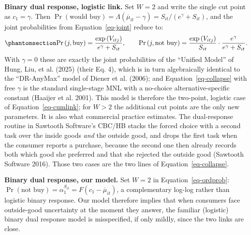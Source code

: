 \documentclass[
  letterpaper,
  DIV=11,
  numbers=noendperiod]{scrartcl}
\theoremstyle{plain}
\theoremstyle{plain}
\theoremstyle{plain}
\theoremstyle{remark}
\begin{document}
\textbf{Binary dual response, logistic link.} Set \(W=2\) and write the
single cut point as \(c_1 = \gamma\). Then
\(\Pr(\text{would buy}) = \Lambda\left( \overline{\mu}_{it} - \gamma \right) = S_{it} \big/ \left( e^{\gamma} + S_{it} \right)\),
and the joint probabilities from Equation~\ref{eq-joint} reduce to:
\begin{equation}\protect\phantomsection\label{eq-collapse}{
\Pr \left( j, \text{buy} \right) = \frac{\exp \left( V_{itj} \right)}{e^{\gamma} + S_{it}},
\qquad
\Pr \left( j, \text{not buy} \right) = \frac{\exp \left( V_{itj} \right)}{S_{it}} \cdot \frac{e^{\gamma}}{e^{\gamma} + S_{it}}.
}\end{equation} With \(\gamma = 0\) these are exactly the joint
probabilities of the ``Unified Model'' of Hung, Liu, et al. (2025)
(their Eq. 4), which is in turn algebraically identical to the
``DR-AnyMax'' model of Diener et al. (2006); and
Equation~\ref{eq-collapse} with free \(\gamma\) is the standard
single-stage MNL with a no-choice alternative-specific constant (Haaijer
et al. 2001). This model is therefore the two-point, logistic case of
Equation~\ref{eq-cumlink}; for \(W>2\) the additional cut points are the
only new parameters. It is also what commercial practice estimates. The
dual-response routine in Sawtooth Software's CBC/HB stacks the forced
choice with a second task over the inside goods \emph{and} the outside
good, and drops the first task when the consumer reports a purchase,
because the second one then already records both which good she
preferred and that she rejected the outside good (Sawtooth Software
2016). Those two cases are the two lines of Equation~\ref{eq-collapse}.

\textbf{Binary dual response, our model.} Set \(W=2\) in
Equation~\ref{eq-ordprob}:
\(\Pr(\text{not buy}) = \alpha_1^{S_{it}} = F\left( c_1 - \overline{\mu}_{it}\right)\),
a complementary log-log rather than logistic binary response. Our model
therefore implies that when consumers face outside-good uncertainty at
the moment they answer, the familiar (logistic) binary dual response
model is misspecified, if only mildly, since the two links are close.
\end{document}
